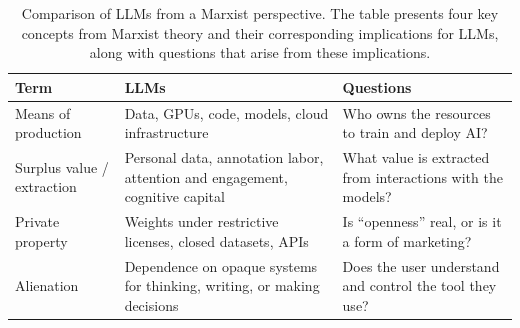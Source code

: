 \documentclass{article}
\begin{document}
\begin{table}[t]
\centering
\caption{Comparison of LLMs from a Marxist perspective. The table presents four key concepts from Marxist theory and their corresponding implications for LLMs, along with questions that arise from these implications.}
\label{tab:llm_comparison}
\renewcommand{\arraystretch}{1.2}
\begin{tabular}{|p{}|p{}|p{}|}
\hline
Term & LLMs & Questions \\
\hline
Means of production & Data, GPUs, code, models, cloud infrastructure & Who owns the resources to train and deploy AI? \\
\hline
Surplus value / extraction & Personal data, annotation labor, attention and engagement, cognitive capital & What value is extracted from interactions with the models? \\
\hline
Private  property & Weights under restrictive licenses, closed datasets, APIs & Is “openness” real, or is it a form of marketing? \\
\hline
Alienation & Dependence on opaque systems for thinking, writing, or making decisions & Does the user understand and control the tool they use? \\
\hline
\end{tabular}
\end{table}





\printbibliography
\end{document}
